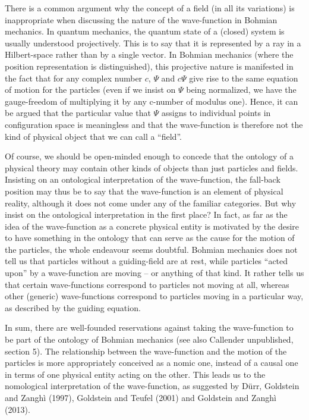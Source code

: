 \documentclass[12pt,a4paper]{article}
\theoremstyle{definition}
\begin{document}
There is a common argument why the concept of a field (in all its variations) is inappropriate when discussing the nature of the wave-function in Bohmian mechanics. In quantum mechanics, the quantum state of a (closed) system is usually understood projectively. This is to say that it is represented by a ray in a Hilbert-space rather than by a single vector. In Bohmian mechanics (where the position representation is distinguished), this projective nature is manifested in the fact that for any complex number $c$, $\Psi$ and $c\Psi$ give rise to the same equation of motion for the particles (even if we insist on $\Psi$ being normalized, we have the gauge-freedom of multiplying it by any c-number of modulus one). Hence, it can be argued that the particular value that $\Psi$ assigns to individual points in configuration space is meaningless and that the wave-function is therefore not the kind of physical object that we can call a ``field''.

Of course, we should be open-minded enough to concede that the ontology of a physical theory may contain other kinds of objects than just particles and fields. Insisting on an ontological interpretation of the wave-function, the fall-back position may thus be to say that the wave-function is an element of physical reality, although it does not come under any of the familiar categories. But why insist on the ontological interpretation in the first place? In fact, as far as the idea of the wave-function as a concrete physical entity is motivated by the desire to have something in the ontology that can serve as the cause for the motion of the particles, the whole endeavour seems doubtful. Bohmian mechanics does not tell us that particles without a guiding-field are at rest, while particles ``acted upon'' by a wave-function are moving -- or anything of that kind. It rather tells us that certain wave-functions correspond to particles not moving at all, whereas other (generic) wave-functions correspond to particles moving in a particular way, as described by the guiding equation.

In sum, there are well-founded reservations against taking the wave-function to be part of the ontology of Bohmian mechanics (see also Callender unpublished, section 5). The relationship between the wave-function and the motion of the particles is more appropriately conceived as a nomic one, instead of a causal one in terms of one physical entity acting on the other. This leads us to the nomological interpretation of the wave-function, as suggested by D\"urr, Goldstein and Zangh\`i (1997), Goldstein and Teufel (2001) and Goldstein and Zangh\`i (2013).
\end{document}
